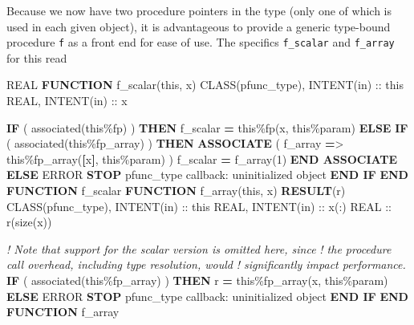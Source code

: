 \documentclass[]{scrartcl}
\newenvironment{Shaded}{}{}
\newcommand{\CommentTok}[1]{\textcolor[rgb]{0.38,0.63,0.69}{\textit{#1}}}
\newcommand{\DataTypeTok}[1]{\textcolor[rgb]{0.56,0.13,0.00}{#1}}
\newcommand{\DecValTok}[1]{\textcolor[rgb]{0.25,0.63,0.44}{#1}}
\newcommand{\FunctionTok}[1]{\textcolor[rgb]{0.02,0.16,0.49}{#1}}
\newcommand{\KeywordTok}[1]{\textcolor[rgb]{0.00,0.44,0.13}{\textbf{#1}}}
\newcommand{\NormalTok}[1]{#1}
\newcommand{\OperatorTok}[1]{\textcolor[rgb]{0.40,0.40,0.40}{#1}}
\newcommand{\StringTok}[1]{\textcolor[rgb]{0.25,0.44,0.63}{#1}}
\begin{document}
Because we now have two procedure pointers in the type (only one of
which is used in each given object), it is advantageous to provide a
generic type-bound procedure \texttt{f} as a front end for ease of use.
The specifics \texttt{f\_scalar} and \texttt{f\_array} for this read

\begin{Shaded}
\begin{Highlighting}[]
\DataTypeTok{REAL} \KeywordTok{FUNCTION}\NormalTok{ f\_scalar(this, x)}
   \DataTypeTok{CLASS(pfunc\_type)}\NormalTok{, }\DataTypeTok{INTENT(in)} \DataTypeTok{::}\NormalTok{ this}
   \DataTypeTok{REAL}\NormalTok{, }\DataTypeTok{INTENT(in)} \DataTypeTok{::}\NormalTok{ x}

   \KeywordTok{IF}\NormalTok{ ( }\FunctionTok{associated}\NormalTok{(this}\OperatorTok{\%}\NormalTok{fp) ) }\KeywordTok{THEN}
\NormalTok{      f\_scalar }\KeywordTok{=}\NormalTok{ this}\OperatorTok{\%}\NormalTok{fp(x, this}\OperatorTok{\%}\NormalTok{param)}
   \KeywordTok{ELSE} \KeywordTok{IF}\NormalTok{ ( }\FunctionTok{associated}\NormalTok{(this}\OperatorTok{\%}\NormalTok{fp\_array) ) }\KeywordTok{THEN}
      \KeywordTok{ASSOCIATE}\NormalTok{ ( f\_array }\KeywordTok{=}\OperatorTok{\textgreater{}}\NormalTok{ this}\OperatorTok{\%}\NormalTok{fp\_array(}\KeywordTok{[}\NormalTok{x}\KeywordTok{]}\NormalTok{, this}\OperatorTok{\%}\NormalTok{param) )}
\NormalTok{         f\_scalar }\KeywordTok{=}\NormalTok{ f\_array(}\DecValTok{1}\NormalTok{)}
      \KeywordTok{END ASSOCIATE}
   \KeywordTok{ELSE}
\NormalTok{      ERROR }\KeywordTok{STOP} \StringTok{\textquotesingle{}pfunc\_type callback: uninitialized object\textquotesingle{}}
   \KeywordTok{END IF}
\KeywordTok{END FUNCTION}\NormalTok{ f\_scalar}
\KeywordTok{FUNCTION}\NormalTok{ f\_array(this, x) }\KeywordTok{RESULT}\NormalTok{(r)}
   \DataTypeTok{CLASS(pfunc\_type)}\NormalTok{, }\DataTypeTok{INTENT(in)} \DataTypeTok{::}\NormalTok{ this}
   \DataTypeTok{REAL}\NormalTok{, }\DataTypeTok{INTENT(in)} \DataTypeTok{::}\NormalTok{ x(:)}
   \DataTypeTok{REAL} \DataTypeTok{::}\NormalTok{ r(}\FunctionTok{size}\NormalTok{(x))}

   \CommentTok{! Note that support for the scalar version is omitted here, since}
   \CommentTok{! the procedure call overhead, including type resolution, would}
   \CommentTok{! significantly impact performance.}
   \KeywordTok{IF}\NormalTok{ ( }\FunctionTok{associated}\NormalTok{(this}\OperatorTok{\%}\NormalTok{fp\_array) ) }\KeywordTok{THEN}
\NormalTok{      r }\KeywordTok{=}\NormalTok{ this}\OperatorTok{\%}\NormalTok{fp\_array(x, this}\OperatorTok{\%}\NormalTok{param)}
   \KeywordTok{ELSE}
\NormalTok{      ERROR }\KeywordTok{STOP} \StringTok{\textquotesingle{}pfunc\_type callback: uninitialized object\textquotesingle{}}
   \KeywordTok{END IF}
\KeywordTok{END FUNCTION}\NormalTok{ f\_array}
\end{Highlighting}
\end{Shaded}
\end{document}
